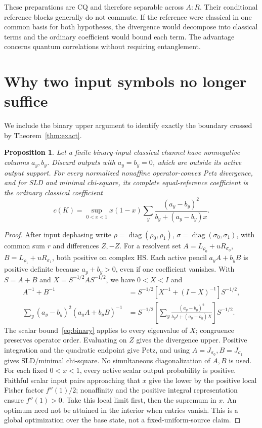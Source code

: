 \documentclass[11pt]{article}
\newtheorem{proposition}[theorem]{Proposition}
\theoremstyle{remark}\newtheorem{remark}[theorem]{Remark}
\newcommand{\diag}{\operatorname{diag}}
\begin{document}
These preparations are CQ and therefore separable across $A:R$. Their conditional reference blocks generally do not commute. If the reference were classical in one common basis for both hypotheses, the divergence would decompose into classical terms and the ordinary coefficient would bound each term. The advantage concerns quantum correlations without requiring entanglement.

\section{Why two input symbols no longer suffice}
We include the binary upper argument to identify exactly the boundary crossed by Theorem~\ref{thm:exact}.
\begin{proposition}\label{prop:binary}
Let a finite binary-input classical channel have nonnegative columns $a_y,b_y$. Discard outputs with $a_y=b_y=0$, which are outside its active output support. For every normalized nonaffine operator-convex Petz divergence, and for SLD and minimal chi-square, its complete equal-reference coefficient is the ordinary classical coefficient
\begin{equation}\label{eq:binary}
 c(K)=\sup_{0<x<1}x(1-x)\sum_y
 \frac{(a_y-b_y)^2}{b_y+(a_y-b_y)x}.
\end{equation}
\end{proposition}
\begin{proof}
After input dephasing write $\rho=\diag(\rho_0,\rho_1)$, $\sigma=\diag(\sigma_0,\sigma_1)$, with common sum $r$ and differences $Z,-Z$. For a resolvent set $A=L_{\rho_0}+uR_{\sigma_0}$, $B=L_{\rho_1}+uR_{\sigma_1}$, both positive on complex HS. Each active pencil $a_yA+b_yB$ is positive definite because $a_y+b_y>0$, even if one coefficient vanishes. With $S=A+B$ and $X=S^{-1/2}AS^{-1/2}$, we have $0<X<I$ and
\begin{align*}
 A^{-1}+B^{-1}&=S^{-1/2}[X^{-1}+(I-X)^{-1}]S^{-1/2},\\
 \sum_y(a_y-b_y)^2(a_yA+b_yB)^{-1}
 &=S^{-1/2}\left[\sum_y\frac{(a_y-b_y)^2}
 {b_yI+(a_y-b_y)X}\right]S^{-1/2}.
\end{align*}
The scalar bound~\eqref{eq:binary} applies to every eigenvalue of $X$; congruence preserves operator order. Evaluating on $Z$ gives the divergence upper. Positive integration and the quadratic endpoint give Petz, and using $A=J_{\sigma_0},B=J_{\sigma_1}$ gives SLD/minimal chi-square. No simultaneous diagonalization of $A,B$ is used. For each fixed $0<x<1$, every active scalar output probability is positive. Faithful scalar input pairs approaching that $x$ give the lower by the positive local Fisher factor $f''(1)/2$; nonaffinity and the positive integral representation ensure $f''(1)>0$. Take this local limit first, then the supremum in $x$. An optimum need not be attained in the interior when entries vanish. This is a global optimization over the base state, not a fixed-uniform-source claim.
\end{proof}
\end{document}
